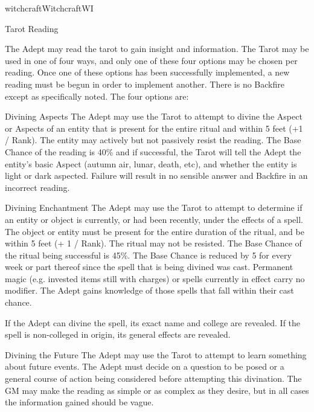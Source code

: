 \begin{College}[1.1]{witchcraft}{Witchcraft}{WI}
\begin{ritual}[Q-2]{Tarot Reading}

\begin{effects}
The Adept may read the tarot to gain insight and information.  The
Tarot may be used in one of four ways, and only one of these four
options may be chosen per reading. Once one of these options has been
successfully implemented, a new reading must be begun in order to
implement another.  There is no Backfire except as specifically
noted. The four options are:
\begin{Description}
\item[Divining Aspects] The Adept may use the Tarot to attempt to
  divine the Aspect or Aspects of an entity that is present for the
  entire ritual and within 5 feet (+1 / Rank).  The entity may
  actively but not passively resist the reading.  The Base Chance of
  the reading is 40\% and if successful, the Tarot will tell the Adept
  the entity’s basic Aspect (autumn air, lunar, death, etc), and
  whether the entity is light or dark aspected.  Failure will result
  in no sensible answer and Backfire in an incorrect reading.

\item[Divining Enchantment] The Adept may use the Tarot to attempt to
  determine if an entity or object is currently, or had been recently,
  under the effects of a spell. The object or entity must be present
  for the entire duration of the ritual, and be within 5 feet (+ 1 /
  Rank).  The ritual may not be resisted.  The Base Chance of the
  ritual being successful is 45\%.  The Base Chance is reduced by 5
  for every week or part thereof since the spell that is being divined
  was cast.  Permanent magic (e.g.  invested items still with charges)
  or spells currently in effect carry no modifier.  The Adept gains
  knowledge of those spells that fall within their cast chance.

  If the Adept can divine the spell, its exact name and college are
  revealed.  If the spell is non-colleged in origin, its general
  effects are revealed.

\item[Divining the Future] The Adept may use the Tarot to attempt to
  learn something about future events.  The Adept must decide on a
  question to be posed or a general course of action being considered
  before attempting this divination.  The GM may make the reading as
  simple or as complex as they desire, but in all cases the
  information gained should be vague.


\end{Description}
\end{effects}
\end{ritual}
\end{College}
